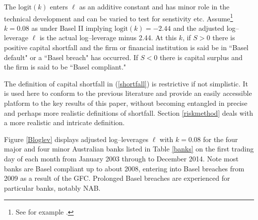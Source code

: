 \documentclass[authoryear]{elsarticle}
\newcommand{\logit}{\mathrm{logit}}
\newcommand{\eref}[1]{(\ref{#1})}
\newcommand{\fref}[1]{Figure \ref{#1}}
\newcommand{\sref}[1]{Section \ref{#1}}
\newcommand{\tref}[1]{Table \ref{#1}}
\begin{document}
The $\logit(k)$ enters $\ell$ as an additive constant and has  minor role in the technical development and can be varied to test for senstivity etc.  Assume\footnote{See for example \cite{brownlees2015}.} $k=0.08$ as under Basel II implying $\logit( k)=-2.44$ and the adjusted log--leverage $\ell$ is the actual log--leverage minus 2.44.  At this $k$, if $S>0$ there is positive capital shortfall and  the firm or financial institution is said be in ``Basel default" or a ``Basel breach" has occurred.   If $S<0$ there is capital surplus and  the firm is said to be ``Basel compliant."

The definition of capital shortfall in \eref{shortfall} is restrictive if not simplistic.   It is used here to conform to the previous literature and provide an easily accessible  platform to the key results of this paper,  without becoming entangled in precise and perhaps more realistic definitions of shortfall.   \sref{riskmethod} deals with a more realistic and intricate definition.  

\fref{Bloglev} displays adjusted log--leverages $\ell$ with $ k=0.08$ for the four major and four minor Australian banks listed in \tref{banks} on the first trading day of each month from January 2003  through to December 2014.  Note most banks are Basel compliant up to about 2008, entering into Basel breaches from 2009 as a result of the GFC. Prolonged Basel breaches are experienced for particular banks, notably NAB.
\end{document}
